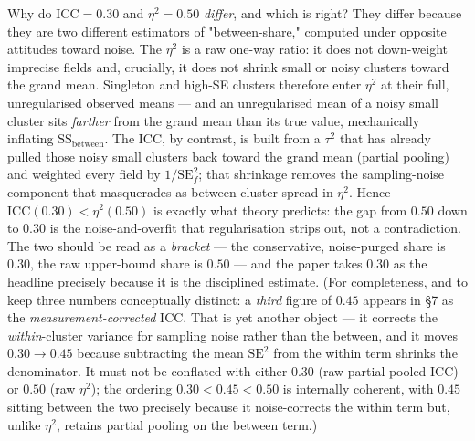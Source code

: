 \documentclass[11pt]{article}
\begin{document}
Why do $\mathrm{ICC}=0.30$ and $\eta^2=0.50$ \emph{differ}, and which is right? They differ because they are two different estimators of "between-share," computed under opposite attitudes toward noise. The $\eta^2$ is a raw one-way ratio: it does not down-weight imprecise fields and, crucially, it does not shrink small or noisy clusters toward the grand mean. Singleton and high-SE clusters therefore enter $\eta^2$ at their full, unregularised observed means --- and an unregularised mean of a noisy small cluster sits \emph{farther} from the grand mean than its true value, mechanically inflating $\mathrm{SS}_{\text{between}}$. The ICC, by contrast, is built from a $\tau^2$ that has already pulled those noisy small clusters back toward the grand mean (partial pooling) and weighted every field by $1/\mathrm{SE}_f^2$; that shrinkage removes the sampling-noise component that masquerades as between-cluster spread in $\eta^2$. Hence $\mathrm{ICC} (0.30) < \eta^2 (0.50)$ is exactly what theory predicts: the gap from $0.50$ down to $0.30$ is the noise-and-overfit that regularisation strips out, not a contradiction. The two should be read as a \emph{bracket} --- the conservative, noise-purged share is $0.30$, the raw upper-bound share is $0.50$ --- and the paper takes $0.30$ as the headline precisely because it is the disciplined estimate. (For completeness, and to keep three numbers conceptually distinct: a \emph{third} figure of $0.45$ appears in \S7 as the \emph{measurement-corrected} ICC. That is yet another object --- it corrects the \emph{within}-cluster variance for sampling noise rather than the between, and it moves $0.30\to0.45$ because subtracting the mean $\mathrm{SE}^2$ from the within term shrinks the denominator. It must not be conflated with either $0.30$ (raw partial-pooled ICC) or $0.50$ (raw $\eta^2$); the ordering $0.30<0.45<0.50$ is internally coherent, with $0.45$ sitting between the two precisely because it noise-corrects the within term but, unlike $\eta^2$, retains partial pooling on the between term.)
\end{document}

